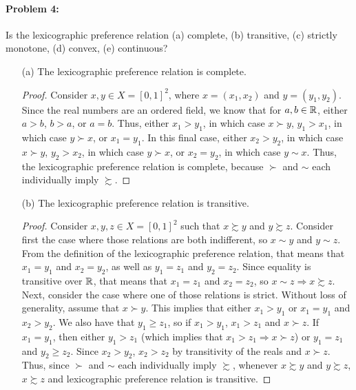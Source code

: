\documentclass[12pt]{article}
\begin{document}
\paragraph{Problem 4:} Is the lexicographic preference relation (a) complete, (b) transitive, (c) strictly monotone, (d) convex, (e) continuous?

\medskip

\begin{itemize}
    \item[(a)] The lexicographic preference relation is complete.

    \begin{proof}
        Consider $x,y \in X = [0,1]^2$, where $x = (x_1,x_2)$ and $y = (y_1,y_2)$. Since the real numbers are an ordered field, we know that for $a,b \in \mathbb{R}$, either $a > b$, $b > a$, or $a = b$. Thus, either $x_1 > y_1$, in which case $x \succ y$, $y_1 > x_1$, in which case $y \succ x$, or $x_1 = y_1$. In this final case, either $x_2 > y_2$, in which case $x \succ y$, $y_2 > x_2$, in which case $y \succ x$, or $x_2 = y_2$, in which case $y \sim x$. Thus, the lexicographic preference relation is complete, because $\succ$ and $\sim$ each individually imply $\succsim$.
    \end{proof}

    \item[(b)] The lexicographic preference relation is transitive.

    \begin{proof}
        Consider $x,y,z \in X = [0,1]^2$ such that $x \succsim y$ and $y \succsim z$. Consider first the case where those relations are both indifferent, so $x \sim y$ and $y \sim z$. From the definition of the lexicographic preference relation, that means that $x_1 = y_1$ and $x_2 = y_2$, as well as $y_1 = z_1$ and $y_2 = z_2$. Since equality is transitive over $\mathbb{R}$, that means that $x_1 = z_1$ and $x_2 = z_2$, so $x \sim z \Rightarrow x \succsim z$. Next, consider the case where one of those relations is strict. Without loss of generality, assume that $x \succ y$. This implies that either $x_1 > y_1$ or $x_1 = y_1$ and $x_2 > y_2$. We also have that $y_1 \ge z_1$, so if $x_1 > y_1$, $x_1 > z_1$ and $x \succ z$. If $x_1 = y_1$, then either $y_1 > z_1$ (which implies that $x_1 > z_1 \Rightarrow x \succ z$) or $y_1 = z_1$ and $y_2 \ge z_2$. Since $x_2 > y_2$, $x_2 > z_2$ by transitivity of the reals and $x \succ z$. Thus, since $\succ$ and $\sim$ each individually imply $\succsim$, whenever $x \succsim y$ and $y \succsim z$, $x \succsim z$ and lexicographic preference relation is transitive.
    \end{proof}


\end{itemize}
\end{document}
